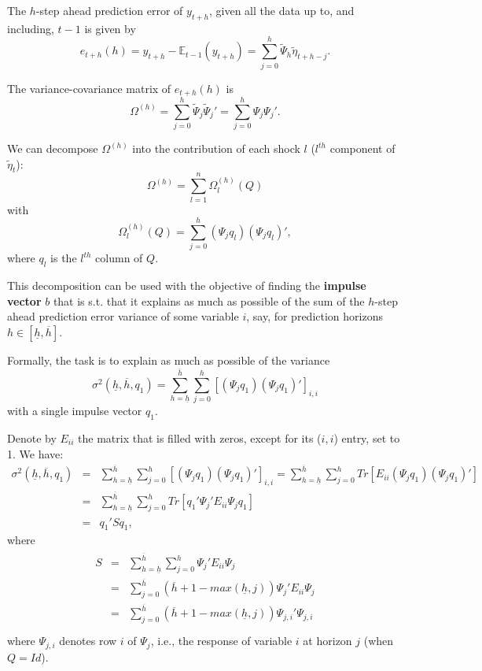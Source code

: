 \documentclass[
  12pt,
]{book}
\theoremstyle{definition}
\theoremstyle{definition}
\theoremstyle{definition}
\theoremstyle{definition}
\theoremstyle{remark}
\begin{document}
The \(h\)-step ahead prediction error of \(y_{t+h}\), given all the data up to, and including, \(t-1\) is given by
\[
e_{t+h}(h)=y_{t+h}-\mathbb{E}_{t-1}(y_{t+h})=\sum_{j=0}^h\tilde \Psi_h\tilde \eta_{t+h-j}.
\]

The variance-covariance matrix of \(e_{t+h}(h)\) is
\[
\Omega^{(h)}=\sum_{j=0}^h\tilde \Psi_j\tilde \Psi_j'=\sum_{j=0}^h \Psi_j \Psi_j'.
\]

We can decompose \(\Omega^{(h)}\) into the contribution of each shock \(l\) (\(l^{th}\) component of \(\tilde{\eta}_t\)):
\[
\Omega^{(h)}=\sum_{l=1}^n\Omega_l^{(h)}(Q)
\]
with
\[
\Omega_l^{(h)}(Q) =\sum_{j=0}^h(\Psi_jq_l)(\Psi_jq_l)',
\]
where \(q_l\) is the \(l^{th}\) column of \(Q\).

This decomposition can be used with the objective of finding the \textbf{impulse vector} \(b\) that is s.t. that it explains as much as possible of the sum of the \(h\)-step ahead prediction error variance of some variable \(i\), say, for prediction horizons \(h \in [\underline{h} , \overline{h}]\).

Formally, the task is to explain as much as possible of the variance
\[
\sigma^2(\underline{h},\overline{h},q_1)=\sum_{h=\underline{h}}^{\overline{h}} \sum_{j=0}^h\left[(\Psi_jq_1)(\Psi_jq_1)'\right]_{i,i}
\]
with a single impulse vector \(q_1\).

Denote by \(E_{ii}\) the matrix that is filled with zeros, except for its (\(i,i\)) entry, set to 1. We have:
\begin{eqnarray*}
\sigma^2(\underline{h},\overline{h},q_1)&=&\sum_{h=\underline{h}}^{\overline{h}} \sum_{j=0}^h\left[(\Psi_jq_1)(\Psi_jq_1)'\right]_{i,i}=\sum_{h=\underline{h}}^{\overline{h}} \sum_{j=0}^h Tr\left[E_{ii}(\Psi_jq_1)(\Psi_jq_1)'\right]\\
&=&\sum_{h=\underline{h}}^{\overline{h}} \sum_{j=0}^h Tr\left[q_1'\Psi_j'E_{ii}\Psi_j q_1\right]\\
&=& q_1'Sq_1,
\end{eqnarray*}
where
\begin{eqnarray*}
\begin{array}{lll}S&=&\sum_{h=\underline{h}}^{\overline{h}}\sum_{j=0}^{h}\Psi_j'E_{ii}\Psi_j\\
&=&\sum_{j=0}^{\overline{h}}(\overline{h}+1-max(\underline{h},j))\Psi_j'E_{ii}\Psi_j\\
&=&\sum_{j=0}^{\overline{h}}(\overline{h}+1-max(\underline{h},j))\Psi_{j,i}'\Psi_{j,i}\\
\end{array}
\end{eqnarray*}
where \(\Psi_{j,i}\) denotes row \(i\) of \(\Psi_{j}\), i.e., the response of variable \(i\) at horizon \(j\) (when \(Q=Id\)).
\end{document}
